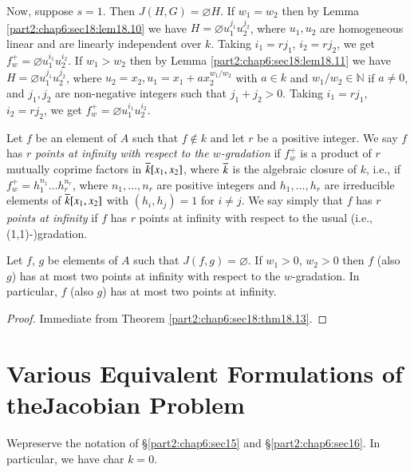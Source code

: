 Now, suppose $s=1$. Then $J(H, G) = \diameter H$. If $w_1= w_2$ then
by Lemma \ref{part2:chap6:sec18:lem18.10} we have $H = \diameter
u_1^{j_1} u_2^{j_2}$, where $u_1, u_2$ are homogeneous linear and are
linearly independent over $k$. Taking $i_1 = rj_1$, $i_2 = rj_2$, we
get $f_w^+= \diameter u_1^{i_1} u_2^{i_2}$. If $w_1 > w_2$ then by
Lemma \ref{part2:chap6:sec18:lem18.11} we have $H= \diameter u_1^{j_1}
u_2^{j_2}$, where $u_2 = x_2, u_1= x_1 + ax_2^{w_1/w_2}$ with $a \in
k$ and $w_1/w_2 \in \mathbb{N}$ if $a \neq 0$, and $j_1, j_2$ are
non-negative integers such that $j_1 + j_2>0$. Taking $i_1 = rj_1$,
$i_2= rj_2$, we get $f_w^+ = \diameter u_1^{i_1} u_2^{i_2}$.

\begin{defi}\label{part2:chap6:sec18:def18.14}
  Let $f$ be an element of $A$ such that $f \notin k$ and let $r$ be a
  positive integer. We say $f$ has $r$ {\em points at infinity with
    respect to the $w$-gradation} if $f_w^+$ is a product of $r$
  mutually coprime factors in $\overline{k} [x_1, x_2]$, where $\overline{k}$ is
  the algebraic closure of $k$, i.e., if $f_w^+ = h_1^{n_1}\ldots
  h_r^{n_r}$, where $n_1, \ldots , n_r$ are positive integers and
  $h_1, \dots , h_r$ are irreducible elements of $\overline{k} [x_1, x_2]$
  with \gcd $(h_i, h_j)=1$ for $i \neq j$. We say simply that $f$ has
  $r$ {\em points at infinity} if $f$ has $r$ points at infinity with
  respect to the usual (i.e., (1,1)-)gradation.
\end{defi}

\begin{coro}\label{part2:chap6:sec18:coro18.15}
  Let $f$, $g$ be elements of $A$ such that $J(f, g)=\diameter$. If
  $w_1 > 0$, $w_2 > 0$ then $f$ (also $g$) has at most two points at
  infinity with respect to the $w$-gradation. In particular, $f$ (also
  $g$) has at most two points at infinity.
\end{coro}

\begin{proof}
  Immediate from Theorem \ref{part2:chap6:sec18:thm18.13}.
\end{proof}

\section[Various Equivalent Formulations of the...]{Various Equivalent
  Formulations of the\hfil\break Jacobian 
  Problem}\label{part2:chap6:sec19}  

We\pageoriginale preserve the notation of \S \ref{part2:chap6:sec15}  and
\S \ref{part2:chap6:sec16}. In particular, we have char $k=0$.

